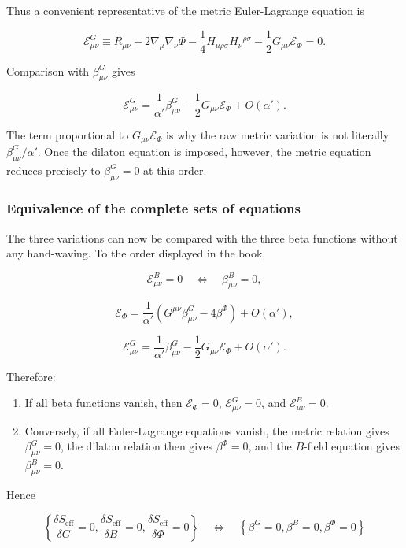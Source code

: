 \documentclass[
  10pt,
  a4paper,
  openany]{book}
\providecommand{\tightlist}{%
  \setlength{\itemsep}{0pt}\setlength{\parskip}{0pt}}
\begin{document}
Thus a convenient representative of the metric Euler-Lagrange equation
is

\[
\boxed{
\mathcal E^G_{\mu\nu}
\equiv
R_{\mu\nu}
+2\nabla_\mu\nabla_\nu\Phi
-\frac14H_{\mu\rho\sigma}H_\nu{}^{\rho\sigma}
-\frac12G_{\mu\nu}\mathcal E_\Phi
=0.
}
\]

Comparison with \(\beta^G_{\mu\nu}\) gives

\[
\boxed{
\mathcal E^G_{\mu\nu}
=\frac1{\alpha'}\beta^G_{\mu\nu}
-\frac12G_{\mu\nu}\mathcal E_\Phi
+O(\alpha').
}
\]

The term proportional to \(G_{\mu\nu}\mathcal E_\Phi\) is why the raw
metric variation is not literally \(\beta^G_{\mu\nu}/\alpha'\). Once the
dilaton equation is imposed, however, the metric equation reduces
precisely to \(\beta^G_{\mu\nu}=0\) at this order.

\subsubsection{Equivalence of the complete sets of
equations}\label{equivalence-of-the-complete-sets-of-equations}

The three variations can now be compared with the three beta functions
without any hand-waving. To the order displayed in the book,

\[
\mathcal E^B_{\mu\nu}=0
\quad\Longleftrightarrow\quad
\beta^B_{\mu\nu}=0,
\]

\[
\mathcal E_\Phi
=\frac1{\alpha'}
\left(G^{\mu\nu}\beta^G_{\mu\nu}-4\beta^\Phi\right)
+O(\alpha'),
\]

\[
\mathcal E^G_{\mu\nu}
=\frac1{\alpha'}\beta^G_{\mu\nu}
-\frac12G_{\mu\nu}\mathcal E_\Phi
+O(\alpha').
\]

Therefore:

\begin{enumerate}
\def\labelenumi{\arabic{enumi}.}
\tightlist
\item
  If all beta functions vanish, then \(\mathcal E_\Phi=0\),
  \(\mathcal E^G_{\mu\nu}=0\), and \(\mathcal E^B_{\mu\nu}=0\).
\item
  Conversely, if all Euler-Lagrange equations vanish, the metric
  relation gives \(\beta^G_{\mu\nu}=0\), the dilaton relation then gives
  \(\beta^\Phi=0\), and the \(B\)-field equation gives
  \(\beta^B_{\mu\nu}=0\).
\end{enumerate}

Hence

\[
\boxed{
\left\{
\frac{\delta S_{\mathrm{eff}}}{\delta G}=0,
\frac{\delta S_{\mathrm{eff}}}{\delta B}=0,
\frac{\delta S_{\mathrm{eff}}}{\delta\Phi}=0
\right\}
\quad\Longleftrightarrow\quad
\left\{
\beta^G=0,
\beta^B=0,
\beta^\Phi=0
\right\}
}
\]
\end{document}
